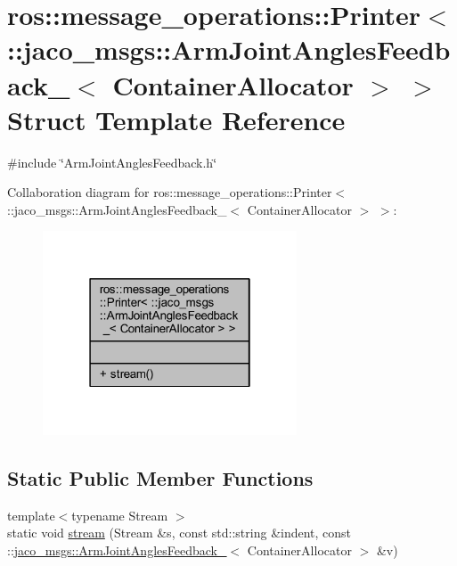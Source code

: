 \hypertarget{structros_1_1message__operations_1_1Printer_3_01_1_1jaco__msgs_1_1ArmJointAnglesFeedback___3_01ContainerAllocator_01_4_01_4}{}\section{ros\+:\+:message\+\_\+operations\+:\+:Printer$<$ \+:\+:jaco\+\_\+msgs\+:\+:Arm\+Joint\+Angles\+Feedback\+\_\+$<$ Container\+Allocator $>$ $>$ Struct Template Reference}
\label{structros_1_1message__operations_1_1Printer_3_01_1_1jaco__msgs_1_1ArmJointAnglesFeedback___3_01ContainerAllocator_01_4_01_4}


{\ttfamily \#include \char`\"{}Arm\+Joint\+Angles\+Feedback.\+h\char`\"{}}



Collaboration diagram for ros\+:\+:message\+\_\+operations\+:\+:Printer$<$ \+:\+:jaco\+\_\+msgs\+:\+:Arm\+Joint\+Angles\+Feedback\+\_\+$<$ Container\+Allocator $>$ $>$\+:
\nopagebreak
\begin{figure}[H]
\begin{center}
\leavevmode
\includegraphics[width=214pt]{da/d66/structros_1_1message__operations_1_1Printer_3_01_1_1jaco__msgs_1_1ArmJointAnglesFeedback___3_01C54d9346cce892a89f34fddf85f756650}
\end{center}
\end{figure}
\subsection*{Static Public Member Functions}
\begin{DoxyCompactItemize}
\item 
{\footnotesize template$<$typename Stream $>$ }\\static void \hyperlink{structros_1_1message__operations_1_1Printer_3_01_1_1jaco__msgs_1_1ArmJointAnglesFeedback___3_01ContainerAllocator_01_4_01_4_ae72c3cd80cbbccd8e562e29482f56e45}{stream} (Stream \&s, const std\+::string \&indent, const \+::\hyperlink{structjaco__msgs_1_1ArmJointAnglesFeedback__}{jaco\+\_\+msgs\+::\+Arm\+Joint\+Angles\+Feedback\+\_\+}$<$ Container\+Allocator $>$ \&v)
\end{DoxyCompactItemize}


